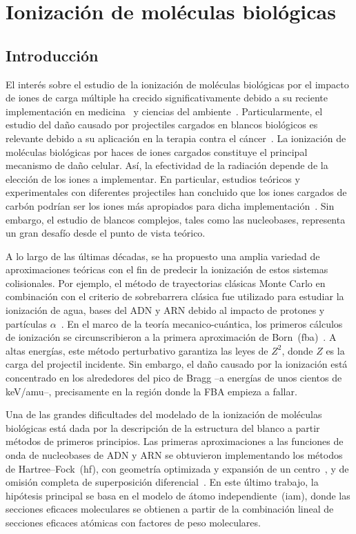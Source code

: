 \chapter{Ionización de moléculas biológicas}
\label{chap:ionmol}

\section{Introducción}

El interés sobre el estudio de la ionización de moléculas biológicas por 
el impacto de iones de carga múltiple ha crecido significativamente 
debido a su reciente implementación en medicina~\cite{Baskar:12,Solov:09} 
y ciencias del ambiente~\cite{Gafur:18,FerrazDias:13}. Particularmente, 
el estudio del daño causado por projectiles cargados en blancos 
biológicos es relevante debido a su aplicación en la terapia contra el 
cáncer~\cite{Baskar:12}. La ionización de moléculas biológicas por haces 
de iones cargados constituye el principal mecanismo de daño celular. 
Así, la efectividad de la radiación depende de la elección de los iones 
a implementar. En particular, estudios teóricos y experimentales con 
diferentes projectiles han concluido que los iones cargados de carbón 
podrían ser los iones más apropiados para dicha 
implementación~\cite{Mohamad:17}. Sin embargo, el estudio de blancos 
complejos, tales como las nucleobases, representa un gran desafío desde 
el punto de vista teórico. 

A lo largo de las últimas décadas, se ha propuesto una amplia variedad 
de aproximaciones teóricas con el fin de predecir la ionización de estos 
sistemas colisionales. Por ejemplo, el método de trayectorias clásicas 
Monte Carlo en combinación con el criterio de sobrebarrera clásica fue 
utilizado para estudiar la ionización de agua, bases del ADN y ARN 
debido al impacto de protones y partículas 
$\alpha$~\cite{Abbas:08,Lekadir:09}. 
En el marco de la teoría mecanico-cuántica, los primeros cálculos de 
ionización se circunscribieron a la primera aproximación de 
Born~(\acs{fba})~\cite{DalCappello:08,Champion:10}. A altas energías, 
este método perturbativo garantiza las leyes de $Z^2$, donde $Z$ es la 
carga del projectil incidente. Sin embargo, el daño causado por la 
ionización está concentrado en los alrededores del pico de Bragg --a 
energías de unos cientos de keV/amu--, precisamente en la región donde 
la FBA empieza a fallar. 

Una de las grandes dificultades del modelado de la ionización de 
moléculas biológicas está dada por la descripción de la estructura del 
blanco a partir métodos de primeros principios. Las primeras 
aproximaciones a las funciones de onda de nucleobases de ADN y ARN se 
obtuvieron implementando los métodos de Hartree--Fock~(\acs{hf}), con 
geometría optimizada y expansión de un centro~\cite{DalCappello:08}, y 
de omisión completa de superposición diferencial~\cite{Champion:10}. En 
este último trabajo, la hipótesis principal se basa en el modelo de 
átomo independiente~(\acs{iam}), donde las secciones eficaces 
moleculares se obtienen a partir de la combinación lineal de secciones 
eficaces atómicas con factores de peso moleculares. 

